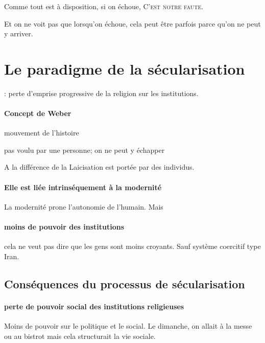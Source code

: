 Comme tout est à disposition, si on échoue, \textsc{C'est notre faute}.


Et on ne voit pas que lorsqu'on échoue, cela peut être parfois parce qu'on ne peut y arriver.


\section{Le paradigme de la sécularisation}

\begin{Def}
[Sécularisation] : perte d’emprise progressive de la religion sur les institutions.

\end{Def}

\paragraph{Concept de Weber} mouvement de l'histoire


\begin{Def}
pas voulu par une personne; on ne peut y échapper
\end{Def}
A la différence de la Laicisation est portée par des individus. 

\paragraph{Elle est liée intrinséquement à la modernité} La modernité prone l'autonomie de l'humain. Mais 

\paragraph{moins de pouvoir des institutions} cela ne veut pas dire que les gens sont moins croyants. Sauf système coercitif type Iran.
\subsection{Conséquences du processus de sécularisation}

\paragraph{ perte de pouvoir social des institutions religieuses} Moins de pouvoir sur le politique et le social. Le dimanche, on allait à la messe ou au bistrot mais cela structurait la vie sociale. 


